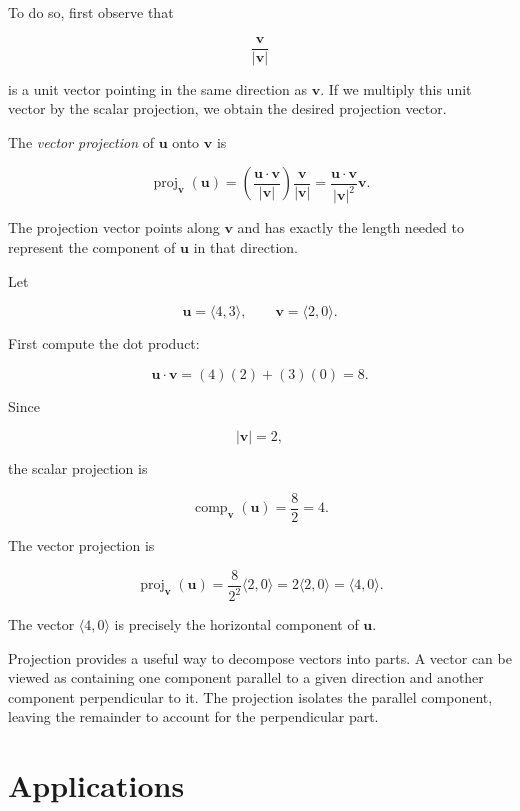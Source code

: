 To do so, first observe that

\[
\frac{\mathbf{v}}{|\mathbf{v}|}
\]

is a unit vector pointing in the same direction as $\mathbf{v}$. If we
multiply this unit vector by the scalar projection, we obtain the desired
projection vector.

\begin{definition}
The \emph{vector projection} of $\mathbf{u}$ onto $\mathbf{v}$ is

\[
\operatorname{proj}_{\mathbf{v}}(\mathbf{u})
=
\left(
\frac{\mathbf{u}\cdot\mathbf{v}}
     {|\mathbf{v}|}
\right)
\frac{\mathbf{v}}
     {|\mathbf{v}|}
=
\frac{\mathbf{u}\cdot\mathbf{v}}
     {|\mathbf{v}|^2}
\mathbf{v}.
\]
\end{definition}

The projection vector points along $\mathbf{v}$ and has exactly the
length needed to represent the component of $\mathbf{u}$ in that
direction.

\begin{example}
Let

\[
\mathbf{u}
=
\langle 4,3\rangle,
\qquad
\mathbf{v}
=
\langle 2,0\rangle.
\]

First compute the dot product:

\[
\mathbf{u}\cdot\mathbf{v}
=
(4)(2)+(3)(0)
=
8.
\]

Since

\[
|\mathbf{v}|=2,
\]

the scalar projection is

\[
\operatorname{comp}_{\mathbf{v}}(\mathbf{u})
=
\frac{8}{2}
=
4.
\]

The vector projection is

\[
\operatorname{proj}_{\mathbf{v}}(\mathbf{u})
=
\frac{8}{2^2}
\langle 2,0\rangle
=
2\langle 2,0\rangle
=
\langle 4,0\rangle.
\]

The vector $\langle 4,0\rangle$ is precisely the horizontal component of
$\mathbf{u}$.
\end{example}

Projection provides a useful way to decompose vectors into parts. A
vector can be viewed as containing one component parallel to a given
direction and another component perpendicular to it. The projection
isolates the parallel component, leaving the remainder to account for the
perpendicular part.

\section{Applications}

